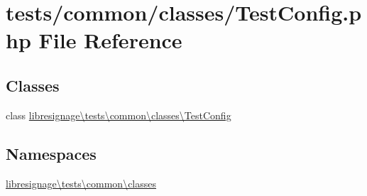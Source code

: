 \hypertarget{TestConfig_8php}{}\section{tests/common/classes/\+Test\+Config.php File Reference}
\label{TestConfig_8php}
\subsection*{Classes}
\begin{DoxyCompactItemize}
\item 
class \hyperlink{classlibresignage_1_1tests_1_1common_1_1classes_1_1TestConfig}{libresignage\textbackslash{}tests\textbackslash{}common\textbackslash{}classes\textbackslash{}\+Test\+Config}
\end{DoxyCompactItemize}
\subsection*{Namespaces}
\begin{DoxyCompactItemize}
\item 
 \hyperlink{namespacelibresignage_1_1tests_1_1common_1_1classes}{libresignage\textbackslash{}tests\textbackslash{}common\textbackslash{}classes}
\end{DoxyCompactItemize}

